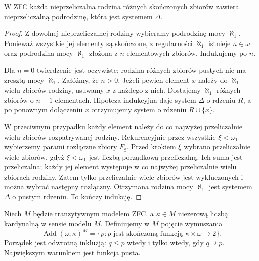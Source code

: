 \begin{lemat}
\label{lem:forcing34-delta}
W ZFC każda nieprzeliczalna rodzina
różnych skończonych zbiorów
zawiera nieprzeliczalną podrodzinę,
która jest systemem $\Delta$.
\end{lemat}
\begin{proof}
Z dowolnej nieprzeliczalnej rodziny
wybieramy podrodzinę mocy $\aleph_1$.
Ponieważ wszystkie jej elementy
są skończone, z regularności
$\aleph_1$ istnieje $n\in\omega$
oraz podrodzina mocy $\aleph_1$
złożona z $n$-elementowych zbiorów.
Indukujemy po $n$.

Dla $n=0$ twierdzenie jest oczywiste;
rodzina różnych zbiorów pustych nie
ma zresztą mocy $\aleph_1$.
Załóżmy, że $n>0$. Jeżeli pewien
element $x$ należy do $\aleph_1$
wielu zbiorów rodziny, usuwamy
$x$ z każdego z nich. Dostajemy
$\aleph_1$ różnych zbiorów o
$n-1$ elementach. Hipoteza
indukcyjna daje system $\Delta$
o rdzeniu $R$, a po ponownym
dołączeniu $x$ otrzymujemy
system o rdzeniu $R\cup\{x\}$.

W przeciwnym przypadku każdy element
należy do co najwyżej przeliczalnie
wielu zbiorów rozpatrywanej rodziny.
Rekurencyjnie przez wszystkie
$\xi<\omega_1$ wybierzemy parami
rozłączne zbiory $F_\xi$.
Przed krokiem $\xi$ wybrano
przeliczalnie wiele zbiorów,
gdyż $\xi<\omega_1$ jest
liczbą porządkową przeliczalną.
Ich suma jest przeliczalna;
każdy jej element występuje
w co najwyżej przeliczalnie
wielu zbiorach rodziny.
Zatem tylko przeliczalnie wiele
zbiorów jest wykluczonych i
można wybrać następny rozłączny.
Otrzymana rodzina mocy $\aleph_1$
jest systemem $\Delta$ o pustym
rdzeniu. To kończy indukcję.
\end{proof}

\begin{definicja}
\label{def:forcing34-many-cohen}
Niech $M$ będzie tranzytywnym
modelem ZFC, a $\kappa\in M$
niezerową liczbą kardynalną
w sensie modelu $M$.
Definiujemy w $M$ pojęcie wymuszania
\[
 \operatorname{Add}(\omega,\kappa)^M
 =\{p:p\text{ jest skończoną funkcją }
       \kappa\times\omega\longrightarrow2\}.
\]
Porządek jest odwrotną inkluzją:
$q\leq p$ wtedy i tylko wtedy,
gdy $q\supseteq p$. Największym
warunkiem jest funkcja pusta.
\end{definicja}

